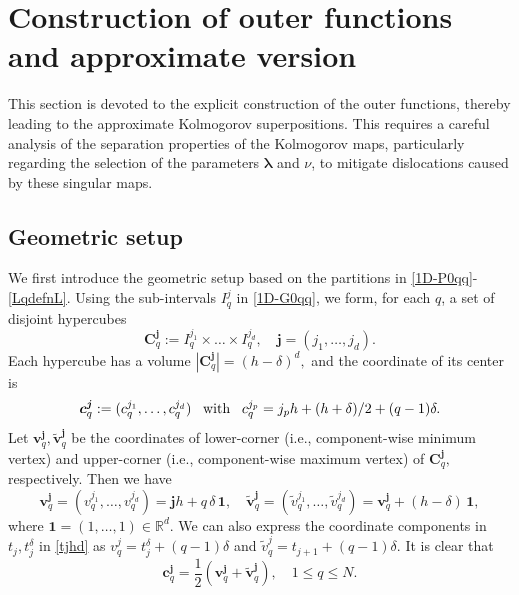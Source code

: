 \documentclass[10pt,reqno,final]{amsart}
\theoremstyle{remark}
\theoremstyle{definition}
\newcommand{\bs}[1]{\boldsymbol{#1}}
\newcommand{\comm}[1]{\marginpar{%
\vskip-\baselineskip %
\raggedright\footnotesize
\itshape\hrule\smallskip {\color{blue}{#1}}\par\smallskip\hrule}}
\begin{document}
\section{Construction of outer functions and approximate version}\label{Sub:center} 

This section is devoted to the explicit construction of the outer functions, thereby leading to the approximate Kolmogorov superpositions.  This requires a careful analysis of the separation properties of the Kolmogorov maps, particularly regarding the selection of the parameters $\bs \lambda$ and $\nu$, to mitigate dislocations caused by these singular maps. 






\subsection{Geometric setup} 
We first introduce the geometric setup based on the partitions in \eqref{1D-P0qq}-\eqref{LqdefnL}. 
Using the sub-intervals $I_q^j$  in \eqref{1D-G0qq}, we form, for each $q$, a set of disjoint hypercubes  
\begin{equation}\label{Cqj}   
 \bs C_q^{\bs j}:= I_q^{j_1}\times \ldots \times   I_q^{j_d},\quad   \bs j=(j_1,\ldots, j_d).
\end{equation} 
Each hypercube has a volume $|\bs C_q^{\bs j}|=(h-\delta)^d,$ and the coordinate of its center is
\begin{equation}\label{cqjcenter}  \bs c_q^{\bs j}:=(c_q^{j_1},\ldots, c_q^{j_d})\;\;\; {\rm with} \;\;\; c_q^{j_p}=j_ph+(h+\delta)/2+(q-1)\delta.
    \end{equation} 
Let
$\bs v_q^{\bs j}, \tilde{\bs v}_q^{\bs j}$ be the coordinates of 
lower-corner (i.e., component-wise minimum vertex) and upper-corner  (i.e., component-wise maximum vertex) 
of  $\bs C_q^{\bs j},$ respectively.  Then we have 
\begin{equation}\label{lower-corner1}
   {\bs v}_{q}^{\bs j}=( v_q^{j_1},\ldots,  v_q^{j_d})=\bs j h+q\,\delta\,\bs 1,\quad \tilde{\bs v}_{q}^{\bs j}=(\tilde v_q^{j_1},\ldots, \tilde v_q^{j_d})=\bs v_q^{\bs j}+(h-\delta)\,\bs 1,
\end{equation}
where $\bs 1=(1,\ldots, 1)\in \mathbb R^d.$ We can also express the coordinate components in  
$t_j, t_j^\delta$  in \eqref{tjhd} as  
$v_q^j=t_j^\delta+(q-1)\delta$ and $\tilde v_q^j=t_{j+1}+(q-1)\delta.$ It is clear that 
\begin{equation}\label{cqjc-00}
\bs c_q^{\bs j}=\frac 1 2 (\bs v_q^{\bs j}+
\tilde {\bs v}_q^{\bs j}),\quad 1\le q\le N.
\end{equation} 
\end{document}
